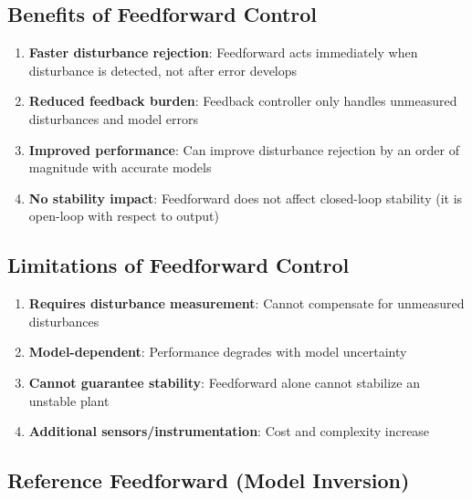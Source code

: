 \subsection{Benefits of Feedforward Control}
\label{subsec:ff_benefits}

\begin{enumerate}
    \item \textbf{Faster disturbance rejection}: Feedforward acts immediately when disturbance is detected, not after error develops

    \item \textbf{Reduced feedback burden}: Feedback controller only handles unmeasured disturbances and model errors

    \item \textbf{Improved performance}: Can improve disturbance rejection by an order of magnitude with accurate models

    \item \textbf{No stability impact}: Feedforward does not affect closed-loop stability (it is open-loop with respect to output)
\end{enumerate}

\subsection{Limitations of Feedforward Control}
\label{subsec:ff_limitations}

\begin{enumerate}
    \item \textbf{Requires disturbance measurement}: Cannot compensate for unmeasured disturbances

    \item \textbf{Model-dependent}: Performance degrades with model uncertainty

    \item \textbf{Cannot guarantee stability}: Feedforward alone cannot stabilize an unstable plant

    \item \textbf{Additional sensors/instrumentation}: Cost and complexity increase
\end{enumerate}


\subsection{Reference Feedforward (Model Inversion)}
\label{subsec:reference_ff}

